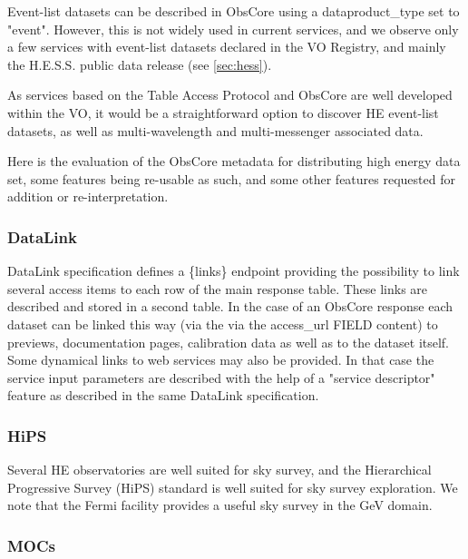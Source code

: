 \documentclass[11pt,a4paper]{ivoa}
\begin{document}
Event-list datasets can be described in ObsCore using a dataproduct\_type set to "event". However, this is not widely used in current services, and we observe only a few services with event-list datasets declared in the VO Registry, and mainly the H.E.S.S. public data release (see \ref{sec:hess}).

As services based on the Table Access Protocol \citep{2019ivoa.spec.0927D} and ObsCore are well developed within the VO, it would be a straightforward option to discover HE event-list datasets, as well as multi-wavelength and multi-messenger associated data.

Here is the evaluation of the ObsCore metadata for distributing high energy data set, some features being re-usable as such, and some other features requested for addition or re-interpretation.


\subsubsection{DataLink}


DataLink specification \citep{2023ivoa.spec.1215B} defines a \{links\} endpoint providing the possibility to link several
access items to each row of the main response table. These links are described and stored in a second
table. In the case of an ObsCore response each dataset can be linked this way (via the via the access\_url
FIELD content) to previews, documentation pages, calibration data as well as to the dataset itself.
Some dynamical links to web services may also be provided. In that case the service input parameters are
described with the help of a "service descriptor" feature as described in the same DataLink specification.

\subsubsection{HiPS}

Several HE observatories are well suited for sky survey, and the Hierarchical Progressive Survey (HiPS) standard is well suited for sky survey exploration. We note that the Fermi facility provides a useful sky survey in the GeV domain.


\subsubsection{MOCs}
\end{document}
